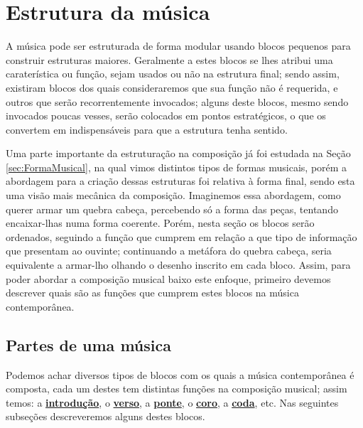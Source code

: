 
\section{Estrutura da música}
\label{sec:estruturadamusica}

A música pode ser estruturada de forma modular 
usando blocos pequenos para construir estruturas maiores.
Geralmente a estes blocos se lhes atribui uma caraterística ou função, 
sejam usados ou não na estrutura final;
sendo assim, existiram blocos dos quais consideraremos que sua função não é requerida,
e outros que serão recorrentemente invocados;
alguns deste blocos, mesmo sendo invocados poucas vesses, 
serão colocados em pontos estratégicos, o que os convertem em indispensáveis 
para que a estrutura tenha sentido.

Uma parte importante da estruturação na composição já foi estudada na Seção \ref{sec:FormaMusical},
na qual vimos distintos tipos de formas musicais, 
porém a abordagem para a criação dessas estruturas foi relativa à forma final,
sendo esta uma visão mais mecânica da composição.
Imaginemos essa abordagem, como querer armar um quebra cabeça,
percebendo só a forma das peças, tentando encaixar-lhas numa forma coerente.
Porém, nesta seção  os blocos serão ordenados, 
seguindo a função que cumprem em relação a que tipo de informação que presentam ao ouvinte;
continuando a metáfora do quebra cabeça, seria equivalente a armar-lho olhando o desenho inscrito em cada bloco.
Assim, para poder abordar a composição musical baixo este enfoque, 
primeiro devemos descrever quais são as funções que cumprem estes blocos na música contemporânea.


\subsection{Partes de uma música}
\label{subsec:partesmusica}
 Podemos achar diversos tipos de blocos com os quais a música contemporânea é composta, 
cada um destes tem distintas funções na composição musical;
assim temos:
a \hyperref[ref:Introducao]{\textbf{introdução}},
o \hyperref[ref:Verse]{\textbf{verso}},
a \hyperref[ref:Ponte]{\textbf{ponte}},
o \hyperref[ref:Coro]{\textbf{coro}},
a \hyperref[ref:Coda]{\textbf{coda}},
etc.
Nas seguintes subseções descreveremos alguns destes blocos.

